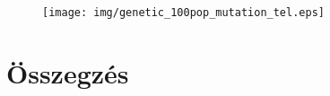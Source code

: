 \documentclass[12pt]{article}
\begin{document}
\begin{figure}[H]
	\centering
	\texttt{[image: img/genetic\_100pop\_mutation\_tel.eps]}
\end{figure}
\section{Összegzés}

\end{document}
